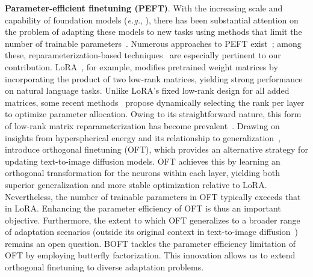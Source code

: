 \textbf{Parameter-efficient finetuning (PEFT)}. With the increasing scale and capability of foundation models (\emph{e.g.}, \cite{brown2020language,radford2021learning,rombach2022high,kirillov2023segment}), there has been substantial attention on the problem of adapting these models to new tasks using methods that limit the number of trainable parameters~\cite{treviso2023efficient,ding2023parameter,lialin2023scaling}. Numerous approaches to PEFT exist~\cite{houlsby2019parameter,aghajanyan2020intrinsic,hulora2022,edalati2022krona,wang2022adamix,gheini2021cross,zaken2022bitfit,guo2020parameter,sung2021training,ansell2022composable,lester2021power,li2021prefix,vu2022spot,he2021towards,mao2021unipelt,karimi2021compacter,liu2022few,sung2022lst,chen2022parameter,jia2022visual,chen2022adaptformer,zhang2022neural,jie2023fact,lian2022scaling,luo2023towards}; among these, reparameterization-based techniques~\cite{aghajanyan2020intrinsic,hulora2022,edalati2022krona} are especially pertinent to our contribution. LoRA~\cite{hulora2022}, for example, modifies pretrained weight matrices by incorporating the product of two low-rank matrices, yielding strong performance on natural language tasks. Unlike LoRA’s fixed low-rank design for all added matrices, some recent methods~\cite{zhang2022adaptive,valipour2022dylora,zhang2023increlora} propose dynamically selecting the rank per layer to optimize parameter allocation. Owing to its straightforward nature, this form of low-rank matrix reparameterization has become prevalent~\cite{dettmers2023qlora,zi2023delta,chavan2023one}. Drawing on insights from hyperspherical energy and its relationship to generalization~\cite{liu2018learning,liu2021orthogonal}, \cite{qiu2023controlling} introduce orthogonal finetuning (OFT), which provides an alternative strategy for updating text-to-image diffusion models. OFT achieves this by learning an orthogonal transformation for the neurons within each layer, yielding both superior generalization and more stable optimization relative to LoRA. Nevertheless, the number of trainable parameters in OFT typically exceeds that in LoRA. Enhancing the parameter efficiency of OFT is thus an important objective. Furthermore, the extent to which OFT generalizes to a broader range of adaptation scenarios (outside its original context in text-to-image diffusion~\cite{qiu2023controlling}) remains an open question. BOFT tackles the parameter efficiency limitation of OFT by employing butterfly factorization. This innovation allows us to extend orthogonal finetuning to diverse adaptation problems.

